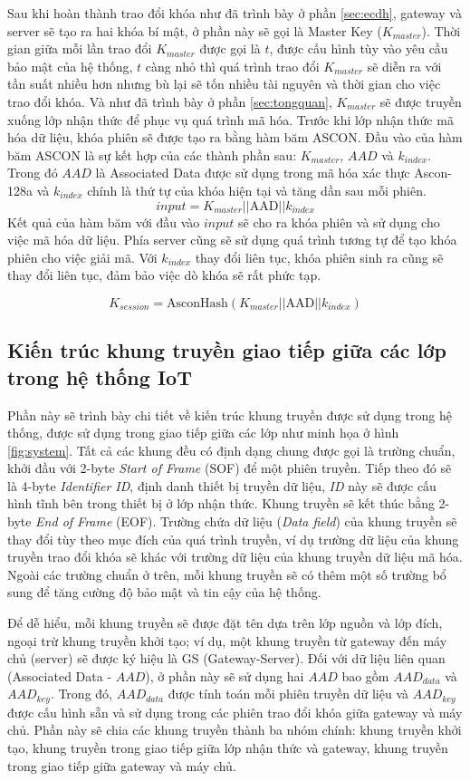 Sau khi hoàn thành trao đổi khóa như đã trình bày ở phần \ref{sec:ecdh}, gateway và server sẽ tạo ra hai khóa bí mật, ở phần này sẽ gọi là Master Key ($K_{master}$). Thời gian giữa mỗi lần trao đổi $K_{master}$ được gọi là $t$, được cấu hình tùy vào yêu cầu bảo mật của hệ thống, $t$ càng nhỏ thì quá trình trao đổi $K_{master}$ sẽ diễn ra với tần suất nhiều hơn nhưng bù lại sẽ tốn nhiều tài nguyên và thời gian cho việc trao đổi khóa. Và như đã trình bày ở phần \ref{sec:tongquan}, $K_{master}$ sẽ được truyền xuống lớp nhận thức để phục vụ quá trình mã hóa.  Trước khi lớp nhận thức mã hóa dữ liệu, khóa phiên sẽ được tạo ra bằng hàm băm ASCON. Đầu vào của hàm băm ASCON là sự kết hợp của các thành phần sau: $K_{master}$, $AAD$ và $k_{index}$. Trong đó $AAD$ là Associated Data được sử dụng trong mã hóa xác thực Ascon-128a và $k_{index}$ chính là thứ tự của khóa hiện tại và tăng dần sau mỗi phiên. 
\[
input = K_{master} || \text{AAD} ||k_{index}
\]
Kết quả của hàm băm với đầu vào $input$ sẽ cho ra khóa phiên và sử dụng cho việc mã hóa dữ liệu. Phía server cũng sẽ sử dụng quá trình tương tự để tạo khóa phiên cho việc giải mã. Với $k_{index}$ thay đổi liên tục, khóa phiên sinh ra cũng sẽ thay đổi liên tục, đảm bảo việc dò khóa sẽ rất phức tạp. 

\[
    K_{session} = \text{AsconHash}(K_{master} || \text{AAD} ||k_{index})
\]

\subsection{Kiến trúc khung truyền giao tiếp giữa các lớp trong hệ thống IoT}
\label{sec:frame}
Phần này sẽ trình bày chi tiết về kiến trúc khung truyền được sử dụng trong hệ thống, được sử dụng trong giao tiếp giữa các lớp như minh họa ở hình \ref{fig:system}. Tất cả các khung đều có định dạng chung được gọi là trường chuẩn, khởi đầu với 2-byte \textit{Start of Frame} (SOF) để một phiên truyền. Tiếp theo đó sẽ là 4-byte \textit{Identifier ID}, định danh thiết bị truyền dữ liệu, \textit{ID} này sẽ được cấu hình tĩnh bên trong thiết bị ở lớp nhận thức. Khung truyền sẽ kết thúc bằng 2-byte \textit{End of Frame} (EOF). Trường chứa dữ liệu (\textit{Data field}) của khung truyền sẽ thay đổi tùy theo mục đích của quá trình truyền, ví dụ trường dữ liệu của khung truyền trao đổi khóa sẽ khác với trường dữ liệu của khung truyền dữ liệu mã hóa. Ngoài các trường chuẩn ở trên, mỗi khung truyền sẽ có thêm một số trường bổ sung để tăng cường độ bảo mật và tin cậy của hệ thống. 

Để dễ hiểu, mỗi khung truyền sẽ được đặt tên dựa trên lớp nguồn và lớp đích, ngoại trừ khung truyền khởi tạo; ví dụ, một khung truyền từ gateway đến máy chủ (server) sẽ được ký hiệu là GS (Gateway-Server). Đối với dữ liệu liên quan (Associated Data - $AAD$), ở phần này sẽ sử dụng hai $AAD$ bao gồm $AAD_{data}$ và $AAD_{key}$. Trong đó, $AAD_{data}$ được tính toán mỗi phiên truyền dữ liệu và $AAD_{key}$ được cấu hình sẵn và sử dụng trong các phiên trao đổi khóa giữa gateway và máy chủ. Phần này sẽ chia các khung truyền thành ba nhóm chính: khung truyền khởi tạo, khung truyền trong giao tiếp giữa lớp nhận thức và gateway, khung truyền trong giao tiếp giữa gateway và máy chủ.
